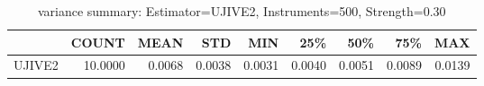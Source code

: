 \begin{table}[ht]
\centering
\caption{variance summary: Estimator=UJIVE2, Instruments=500, Strength=0.30}
\begin{tabular}{lrrrrrrrr}
\toprule
 & COUNT & MEAN & STD & MIN & 25\% & 50\% & 75\% & MAX \\
\midrule
UJIVE2 & 10.0000 & 0.0068 & 0.0038 & 0.0031 & 0.0040 & 0.0051 & 0.0089 & 0.0139 \\
\bottomrule
\end{tabular}
\end{table}

